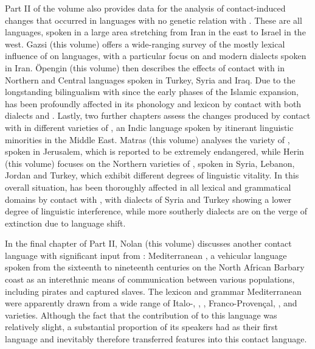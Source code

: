 \documentclass[output=paper]{langsci/langscibook}
\begin{document}
Part II of the volume also provides data for the analysis of contact-induced changes that occurred in languages with no genetic relation with . These are all  languages, spoken in a large area stretching from Iran in the east to Israel in the west. Gazsi (this volume) offers a wide-ranging survey of the mostly lexical influence of  on  languages, with a particular focus on  and modern  dialects spoken in Iran. Öpengin (this volume) then describes the effects of contact with  in Northern and Central  languages spoken in Turkey, Syria and Iraq. Due to the longstanding {bilingualism} with  since the early phases of the Islamic expansion,  has been profoundly affected in its phonology and lexicon by contact with both  dialects and  . Lastly, two further chapters assess the changes produced by contact with  in different varieties of , an Indic language spoken by itinerant linguistic minorities in the Middle East. Matras (this volume) analyses the  variety of , spoken in Jerusalem, which is reported to be extremely {endangered}, while Herin (this volume) focuses on the Northern varieties of , spoken in Syria, Lebanon, Jordan and Turkey, which exhibit different degrees of linguistic vitality. In this overall situation,  has been thoroughly affected in all lexical and grammatical domains by contact with , with dialects of Syria and Turkey showing a lower degree of linguistic interference, while more southerly dialects are on the verge of extinction due to {language shift}.


In the final chapter of Part II, Nolan (this volume) discusses another contact language with significant input from : Mediterranean , a vehicular language spoken from the sixteenth to nineteenth centuries on the North African Barbary coast as an interethnic means of communication between various populations, including pirates and captured slaves. The lexicon and grammar Mediterranean  were apparently drawn from a wide range of Italo-, , , Franco-Provençal, ,  and  varieties. Although the fact that the contribution of  to this language was relatively slight, a substantial proportion of its speakers had  as their first language and inevitably therefore transferred  features into this contact language.
\end{document}
